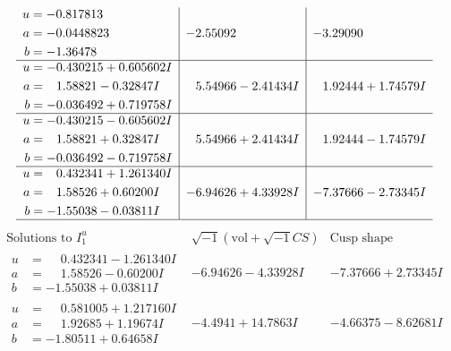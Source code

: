 \documentclass[1p]{elsarticle_modified}
\theoremstyle{definition}
\newcommand{\I}{\sqrt{-1}}
\begin{document}
$$\begin{array}{c|c|c}
\begin{aligned}
u &= -0.817813\phantom{ +0.000000I} \\
a &= -0.0448823\phantom{ +0.000000I} \\
b &= -1.36478\phantom{ +0.000000I}\end{aligned}
 & -2.55092\phantom{ +0.000000I} & -3.29090\phantom{ +0.000000I} \\ \hline\begin{aligned}
u &= -0.430215 + 0.605602 I \\
a &= \phantom{-}1.58821 - 0.32847 I \\
b &= -0.036492 + 0.719758 I\end{aligned}
 & \phantom{-}5.54966 - 2.41434 I & \phantom{-}1.92444 + 1.74579 I \\ \hline\begin{aligned}
u &= -0.430215 - 0.605602 I \\
a &= \phantom{-}1.58821 + 0.32847 I \\
b &= -0.036492 - 0.719758 I\end{aligned}
 & \phantom{-}5.54966 + 2.41434 I & \phantom{-}1.92444 - 1.74579 I \\ \hline\begin{aligned}
u &= \phantom{-}0.432341 + 1.261340 I \\
a &= \phantom{-}1.58526 + 0.60200 I \\
b &= -1.55038 - 0.03811 I\end{aligned}
 & -6.94626 + 4.33928 I & -7.37666 - 2.73345 I\\
 \hline 
 \end{array}$$\newpage$$\begin{array}{c|c|c}  
\text{Solutions to }I^u_{1}& \I (\text{vol} + \sqrt{-1}CS) & \text{Cusp shape}\\
 \hline 
\begin{aligned}
u &= \phantom{-}0.432341 - 1.261340 I \\
a &= \phantom{-}1.58526 - 0.60200 I \\
b &= -1.55038 + 0.03811 I\end{aligned}
 & -6.94626 - 4.33928 I & -7.37666 + 2.73345 I \\ \hline\begin{aligned}
u &= \phantom{-}0.581005 + 1.217160 I \\
a &= \phantom{-}1.92685 + 1.19674 I \\
b &= -1.80511 + 0.64658 I\end{aligned}
 & -4.4941 + 14.7863 I & -4.66375 - 8.62681 I \\ \hline\begin{aligned}

\end{aligned}
\end{array}$$
\end{document}
